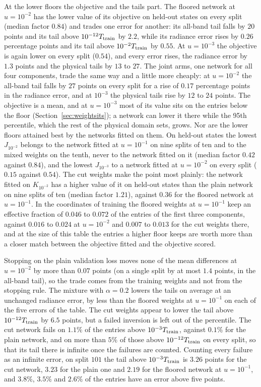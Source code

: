 \documentclass[11pt]{article}
\theoremstyle{remark}
\newcommand{\1}{\mathbf{1}}
\begin{document}
At the lower floors the objective and the tails part. The floored network at $u=10^{-2}$ has the lower value of its
objective on held-out states on every split (median factor $0.84$) and trades one error for another: its all-band tail
falls by $20$ points and its tail above $10^{-12}T_{\rm train}$ by $2.2$, while its radiance error rises by $0.26$
percentage points and its tail above $10^{-2}T_{\rm train}$ by $0.55$. At $u=10^{-3}$ the objective is again lower on
every split ($0.54$), and every error rises, the radiance error by $1.3$ points and the physical tails by $13$ to $27$.
The joint arms, one network for all four components, trade the same way and a little more cheaply: at $u=10^{-2}$ the
all-band tail falls by $27$ points on every split for a rise of $0.17$ percentage points in the radiance error, and at
$10^{-3}$ the physical tails rise by $12$ to $24$ points.
The objective is a mean, and at $u=10^{-3}$ most of its value sits on the entries below the floor
(Section~\ref{sec:weightsits}); a network can lower it there while the 95th percentile, which the rest of the physical
domain sets, grows. Nor are the lower floors attained best by the networks fitted on them. On held-out states the
lowest $J_{10^{-2}}$ belongs to the network fitted at $u=10^{-1}$ on nine splits of ten and to the mixed weights on
the tenth, never to the network fitted on it (median factor $0.42$ against $0.84$), and the lowest $J_{10^{-3}}$ to a
network fitted at $u=10^{-2}$ on every split ($0.15$ against $0.54$). The cut weights make the point most plainly: the
network fitted on $K_{10^{-2}}$ has a higher value of it on held-out states than the plain network on nine splits of
ten (median factor $1.21$), against $0.36$ for the floored network at $u=10^{-1}$. In the coordinates of training the
floored weights at $u=10^{-1}$ keep an effective fraction of $0.046$ to $0.072$ of the entries of the first three
components, against $0.016$ to $0.024$ at $u=10^{-2}$ and $0.007$ to $0.013$ for the cut weights there, and at the
size of this table the entries a higher floor keeps are worth more than a closer match between the objective fitted and
the objective scored.

Stopping on the plain validation loss moves none of the mean differences at $u=10^{-2}$ by more than $0.07$ points
(on a single split by at most $1.4$ points, in the all-band tail), so the trade comes from the training weights and not
from the stopping rule. The mixture with $\alpha=0.2$ lowers the
tails on average at an unchanged radiance error, by less than the floored weights at $u=10^{-1}$ on each of the five
errors of the table. The cut weights
appear to lower the tail above $10^{-12}T_{\rm train}$ by $6.5$ points, but a failed inversion is left out of the
percentile. The cut network fails on $1.1\%$ of the entries above $10^{-3}T_{\rm train}$, against $0.1\%$ for the
plain network, and on more than $5\%$ of those above $10^{-12}T_{\rm train}$ on every split, so that its tail there is
infinite once the failures are counted. Counting every failure as an infinite error, on split $101$ the tail above
$10^{-3}T_{\rm train}$ is $3.26$ points for the cut network, $3.23$ for the plain one and $2.19$ for the floored
network at $u=10^{-1}$, and $3.8\%$, $3.5\%$ and $2.6\%$ of the entries have an error above five points.
\end{document}
